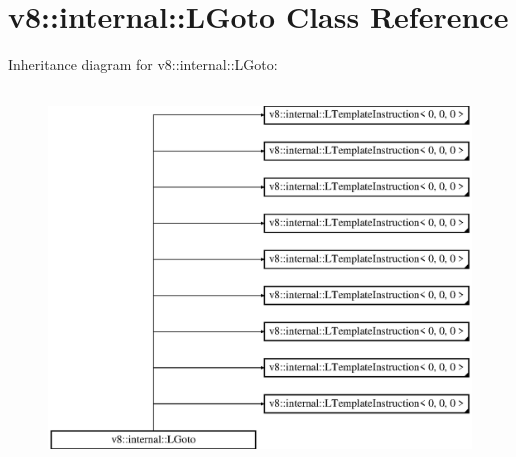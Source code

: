\hypertarget{classv8_1_1internal_1_1_l_goto}{}\section{v8\+:\+:internal\+:\+:L\+Goto Class Reference}
\label{classv8_1_1internal_1_1_l_goto}
Inheritance diagram for v8\+:\+:internal\+:\+:L\+Goto\+:\begin{figure}[H]
\begin{center}
\leavevmode
\includegraphics[height=10.000000cm]{classv8_1_1internal_1_1_l_goto}
\end{center}
\end{figure}
